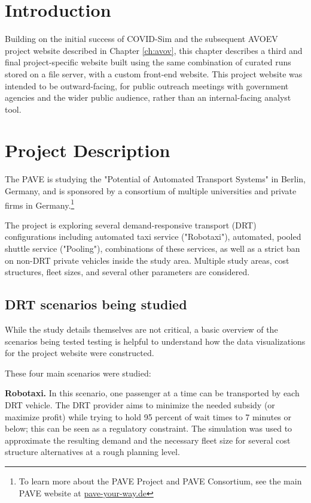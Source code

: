 \section{Introduction}
\label{pave-intro}

Building on the initial success of COVID-Sim and the subsequent AVOEV project website described in Chapter \ref{ch:avov}, this chapter describes a third and final project-specific website built using the same combination of curated runs stored on a file server, with a custom front-end website. This project website was intended to be outward-facing, for public outreach meetings with government agencies and the wider public audience, rather than an internal-facing analyst tool.

\section{Project Description}
\label{pave-project-description}

The \gls{PAVE} is studying the "Potential of Automated Transport Systems" in Berlin, Germany, and is sponsored by a consortium of multiple universities and private firms in Germany.\footnote{To learn more about the PAVE Project and PAVE Consortium, see the main PAVE website at \href{https://pave-your-way.de}{pave-your-way.de}}

The project is exploring several demand-responsive transport (\gls{DRT}) configurations including automated taxi service ("Robotaxi"), automated, pooled shuttle service ("Pooling"), combinations of these services, as well as a strict ban on non-DRT private vehicles inside the study area. Multiple study areas, cost structures, fleet sizes, and several other parameters are considered.

\subsection{DRT scenarios being studied}
\label{pave-scenarios}

While the study details themselves are not critical, a basic overview of the scenarios being tested testing is helpful to understand how the data visualizations for the project website were constructed.

These four main scenarios were studied:

\textbf{Robotaxi.} In this scenario, one passenger at a time can be transported by each DRT vehicle. The DRT provider aims to minimize the needed subsidy (or maximize profit) while trying to hold 95 percent of wait times to 7 minutes or below; this can be seen as a regulatory constraint. The simulation was used to approximate the resulting demand and the necessary fleet size for several cost structure alternatives at a rough planning level.

